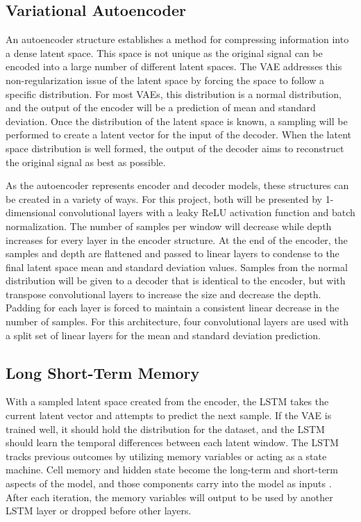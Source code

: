 \documentclass[conference]{IEEEtran}
\begin{document}
\subsection{Variational Autoencoder}
An autoencoder structure establishes a method for compressing information into a dense latent space. This space is not unique as the original signal can be encoded into a large number of different latent spaces. The VAE addresses this non-regularization issue of the latent space by forcing the space to follow a specific distribution\cite{vae_page}. For most VAEs, this distribution is a normal distribution, and the output of the encoder will be a prediction of mean and standard deviation. Once the distribution of the latent space is known, a sampling will be performed to create a latent vector for the input of the decoder. When the latent space distribution is well formed, the output of the decoder aims to reconstruct the original signal as best as possible.

As the autoencoder represents encoder and decoder models, these structures can be created in a variety of ways. For this project, both will be presented by 1-dimensional convolutional layers with a leaky ReLU activation function and batch normalization. The number of samples per window will decrease while depth increases for every layer in the encoder structure. At the end of the encoder, the samples and depth are flattened and passed to linear layers to condense to the final latent space mean and standard deviation values. Samples from the normal distribution will be given to a decoder that is identical to the encoder, but with transpose convolutional layers to increase the size and decrease the depth. Padding for each layer is forced to maintain a consistent  linear decrease in the number of samples. For this architecture, four convolutional layers are used with a split set of linear layers for the mean and standard deviation prediction.

\subsection{Long Short-Term Memory}
With a sampled latent space created from the encoder, the LSTM takes the current latent vector and attempts to predict the next sample. If the VAE is trained well, it should hold the distribution for the dataset, and the LSTM should learn the temporal differences between each latent window. The LSTM tracks previous outcomes by utilizing memory variables or acting as a state machine. Cell memory and hidden state become the long-term and short-term aspects of the model, and those components carry into the model as inputs \cite{lstm_page}. After each iteration, the memory variables will output to be used by another LSTM layer or dropped before other layers.
\end{document}
